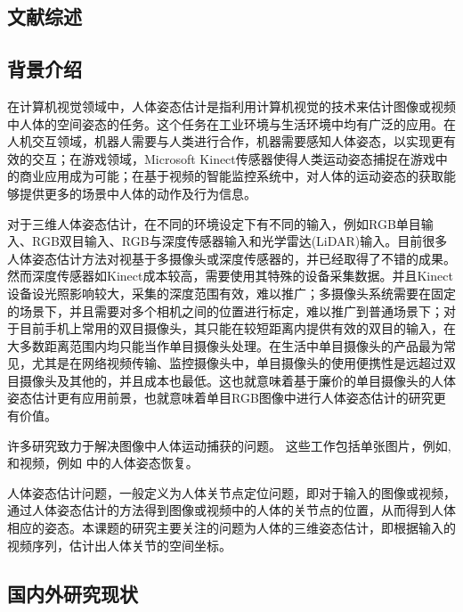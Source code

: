 \cleardoublepage
\begin{refsection}
\chapter{文献综述}

\section{背景介绍}
在计算机视觉领域中，人体姿态估计是指利用计算机视觉的技术来估计图像或视频中人体的空间姿态的任务。这个任务在工业环境与生活环境中均有广泛的应用。在人机交互领域，机器人需要与人类进行合作，机器需要感知人体姿态，以实现更有效的交互；在游戏领域，Microsoft Kinect传感器\cite{shotton2013efficient}使得人类运动姿态捕捉在游戏中的商业应用成为可能；在基于视频的智能监控系统中，对人体的运动姿态的获取能够提供更多的场景中人体的动作及行为信息。

对于三维人体姿态估计，在不同的环境设定下有不同的输入，例如RGB单目输入、RGB双目输入、RGB与深度传感器输入和光学雷达(LiDAR)输入。目前很多人体姿态估计方法对视基于多摄像头或深度传感器的，并已经取得了不错的成果。然而深度传感器如Kinect\cite{kinect}成本较高，需要使用其特殊的设备采集数据。并且Kinect设备设光照影响较大，采集的深度范围有效，难以推广；多摄像头系统需要在固定的场景下，并且需要对多个相机之间的位置进行标定，难以推广到普通场景下；对于目前手机上常用的双目摄像头，其只能在较短距离内提供有效的双目的输入，在大多数距离范围内均只能当作单目摄像头处理。在生活中单目摄像头的产品最为常见，尤其是在网络视频传输、监控摄像头中，单目摄像头的使用便携性是远超过双目摄像头及其他的，并且成本也最低。这也就意味着基于廉价的单目摄像头的人体姿态估计更有应用前景，也就意味着单目RGB图像中进行人体姿态估计的研究更有价值。

许多研究致力于解决图像中人体运动捕获的问题\cite{moeslund2006survey,sminchisescu20073d,brubaker2010video,deva2011_Book,sarafianos20163d}。
这些工作包括单张图片，例如\cite{yang2011articulated,toshev2014deep,chen2014articulated,jain2014learning,tompson2014joint}, 和视频，例如\cite{sapp2011,cherian2014,nie2015joint,park2015articulated,pfister2015flowing,zhang2015human,newell2016stacked} 中的人体姿态恢复。

人体姿态估计问题，一般定义为人体关节点定位问题，即对于输入的图像或视频，通过人体姿态估计的方法得到图像或视频中的人体的关节点的位置，从而得到人体相应的姿态。本课题的研究主要关注的问题为人体的三维姿态估计，即根据输入的视频序列，估计出人体关节的空间坐标。

\section{国内外研究现状}


\end{refsection}
